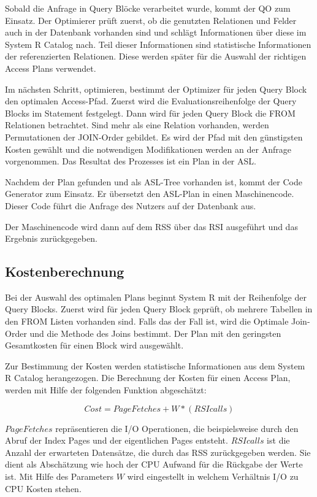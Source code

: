 Sobald die Anfrage in Query Blöcke verarbeitet wurde, kommt der \ac{QO} zum Einsatz. Der Optimierer prüft zuerst, ob die genutzten Relationen und Felder auch in der Datenbank vorhanden sind und schlägt Informationen über diese im System R Catalog nach. Teil dieser Informationen sind statistische Informationen der referenzierten Relationen. Diese werden später für die Auswahl der richtigen Access Plans verwendet.

Im nächsten Schritt, optimieren, bestimmt der Optimizer für jeden Query Block den optimalen Access-Pfad. Zuerst wird die Evaluationsreihenfolge der Query Blocks im Statement festgelegt. Dann wird für jeden Query Block die FROM Relationen betrachtet. Sind mehr als eine Relation vorhanden, werden Permutationen der JOIN-Order gebildet. Es wird der Pfad mit den günstigsten Kosten gewählt und die notwendigen Modifikationen werden an der Anfrage vorgenommen. Das Resultat des Prozesses ist ein Plan in der \ac{ASL}.

Nachdem der Plan gefunden und als \ac{ASL}-Tree vorhanden ist, kommt der Code Generator zum Einsatz. Er übersetzt den \ac{ASL}-Plan in einen  Maschinencode. Dieser Code führt die Anfrage des Nutzers auf der Datenbank aus. 

Der Maschinencode wird dann auf dem \ac{RSS} über das \ac{RSI} ausgeführt und das Ergebnis zurückgegeben.

\subsection{Kostenberechnung}
Bei der Auswahl des optimalen Plans beginnt System R mit der Reihenfolge der Query Blocks. Zuerst wird für jeden Query Block geprüft, ob mehrere Tabellen in den FROM Listen vorhanden sind. Falls das der Fall ist, wird die Optimale Join-Order und die Methode des Joins bestimmt. Der Plan mit den geringsten Gesamtkosten für einen Block wird ausgewählt.

Zur Bestimmung der Kosten werden statistische Informationen aus dem System R Catalog herangezogen. Die Berechnung der Kosten für einen Access Plan, werden mit Hilfe der folgenden Funktion abgeschätzt:

$$Cost = Page Fetches + W * (RSI calls)$$


$Page Fetches$ repräsentieren die I/O Operationen, die beispielsweise durch den Abruf der Index Pages und der eigentlichen Pages entsteht. $RSI calls$ ist die Anzahl der erwarteten Datensätze, die durch das \ac{RSS} zurückgegeben werden. Sie dient als Abschätzung wie hoch der CPU Aufwand für die Rückgabe der Werte ist. Mit Hilfe des Parameters $W$ wird eingestellt in welchem Verhältnis I/O zu CPU Kosten stehen.


